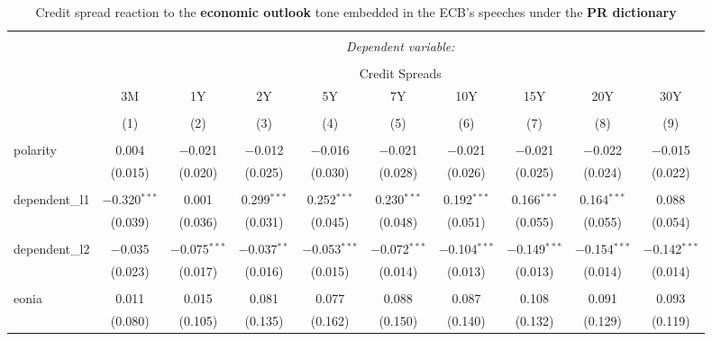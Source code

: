 
\begin{table}[!htbp] \centering 
  \caption[PR Economic Outlook Tone \& Credit Spread: all speeches]{Credit spread reaction to the \textbf{economic outlook} tone embedded in the ECB's speeches under the \textbf{PR dictionary}} 
  \label{tab:spreads_all_pr_ec} 
  \begin{adjustbox}{width=1.25\textwidth}
\begin{tabular}{@{\extracolsep{5pt}}lccccccccc} 
\\[-1.8ex]\hline 
\hline \\[-1.8ex] 
 & \multicolumn{9}{c}{\textit{Dependent variable:}} \\ 
\cline{2-10} 
\\[-1.8ex] & \multicolumn{9}{c}{Credit Spreads} \\ 
 & 3M & 1Y & 2Y & 5Y & 7Y & 10Y & 15Y & 20Y & 30Y \\ 
\\[-1.8ex] & (1) & (2) & (3) & (4) & (5) & (6) & (7) & (8) & (9)\\ 
\hline \\[-1.8ex] 
 polarity & 0.004 & $-$0.021 & $-$0.012 & $-$0.016 & $-$0.021 & $-$0.021 & $-$0.021 & $-$0.022 & $-$0.015 \\ 
  & (0.015) & (0.020) & (0.025) & (0.030) & (0.028) & (0.026) & (0.025) & (0.024) & (0.022) \\ 
  & & & & & & & & & \\ 
 dependent\_l1 & $-$0.320$^{***}$ & 0.001 & 0.299$^{***}$ & 0.252$^{***}$ & 0.230$^{***}$ & 0.192$^{***}$ & 0.166$^{***}$ & 0.164$^{***}$ & 0.088 \\ 
  & (0.039) & (0.036) & (0.031) & (0.045) & (0.048) & (0.051) & (0.055) & (0.055) & (0.054) \\ 
  & & & & & & & & & \\ 
 dependent\_l2 & $-$0.035 & $-$0.075$^{***}$ & $-$0.037$^{**}$ & $-$0.053$^{***}$ & $-$0.072$^{***}$ & $-$0.104$^{***}$ & $-$0.149$^{***}$ & $-$0.154$^{***}$ & $-$0.142$^{***}$ \\ 
  & (0.023) & (0.017) & (0.016) & (0.015) & (0.014) & (0.013) & (0.013) & (0.014) & (0.014) \\ 
  & & & & & & & & & \\ 
 eonia & 0.011 & 0.015 & 0.081 & 0.077 & 0.088 & 0.087 & 0.108 & 0.091 & 0.093 \\ 
  & (0.080) & (0.105) & (0.135) & (0.162) & (0.150) & (0.140) & (0.132) & (0.129) & (0.119) \\ 

\end{tabular}
\end{adjustbox}
\end{table}
